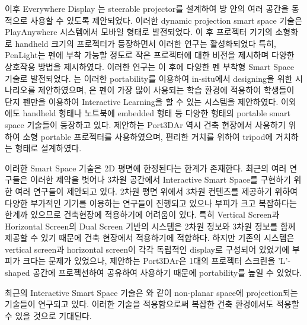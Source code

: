 이후 Everywhere Display\cite{pinhanez_everywhere_2001, pinhanez_creating_2003, sukaviriya_portable_2004} 는 steerable projector를 설계하여 방 안의 여러 공간을 동적으로 사용할 수 있도록 제안되었다. 이러한 dynamic projection smart space 기술은 PlayAnywhere\cite{wilson_playanywhere:_2005} 시스템에서 모바일 형태로 발전되었다. 이 후 프로젝터 기기의 소형화로 handheld 크기의 프로젝터가 등장하면서 이러한 연구는 활성화되었다\cite{cao_interacting_2006, raskar_rfig_2004} 특히, PenLight\cite{song_penlight:_2009}는 펜에 부착 가능할 정도로 작은 프로젝터에 대한 비전을 제시하며 다양한 상호작용 방법을 제시하였다. 이러한 연구는 이 후에 다양한 펜 부착형 Smart Space 기술로 발전되었다. \cite{kim_ar_2013}는 이러한 portability를 이용하여 in-situ에서 designing을 위한 시나리오를 제안하였으며, \cite{kim_ar_2014}은 펜이 가장 많이 사용되는 학습 환경에 적용하여 학생들이 단지 펜만을 이용하여 Interactive Learning을 할 수 있는 시스템을 제안하였다. 이외에도 handheld 형태\cite{huber_lightbeam:_2012, kim_ilight:_2010}나 노트북에 embedded 형태\cite{kane_bonfire:_2009} 등 다양한 형태의 portable smart space 기술들이 등장하고 있다. 제안하는 Port3DAr 역시 건축 현장에서 사용하기 위하여 소형 portable 프로젝터를 사용하였으며, 편리한 거치를 위하여 tripod에 거치하는 형태로 설계하였다.

이러한 Smart Space 기술은 2D 평면에 한정된다는 한계가 존재한다. 최근의 여러 연구들은 이러한 제약을 벗어나 3차원 공간에서 Interactive Smart Space를 구현하기 위한 여러 연구들이 제안되고 있다\cite{grossman__2010}. 2차원 평면 위에서 3차원 컨텐츠를 제공하기 위하여 다양한 부가적인 기기를 이용하는 연구들이 진행되고 있으나 부피가 크고 복잡하다는 한계까 있으므로 건축현장에 적용하기에 어려움이 있다. 특히 Vertical Screen과 Horizontal Screen의 Dual Screen 기반의 시스템\cite{weiss_benddesk:_2010, coram_astrotouch:_2013, wimmer_curve:_2010, benko_miragetable:_2012}은 2차원 정보와 3차원 정보를 함께 제공할 수 있기 때문에 건축 현장에서 적용하기에 적합하다. 하지만 기존의 시스템은 vertical screen과 horizontal screen이 각각 독립적인 display로 구성되어 있었기에 부피가 크다는 문제가 있었으나, 제안하는 Port3DAr은 1대의 프로젝터 스크린을 'L'-shaped 공간에 프로젝션하여 공유하여 사용하기 때문에 portability를 높일 수 있었다.

최근의 Interactive Smart Space 기술은 \cite{jones_illumiroom:_2013, steimle_flexpad:_2013}와 같이 non-planar space에 projection되는 기술들이 연구되고 있다. 이러한 기술을 적용함으로써 복잡한 건축 환경에서도 적용할 수 있을 것으로 기대된다. 

